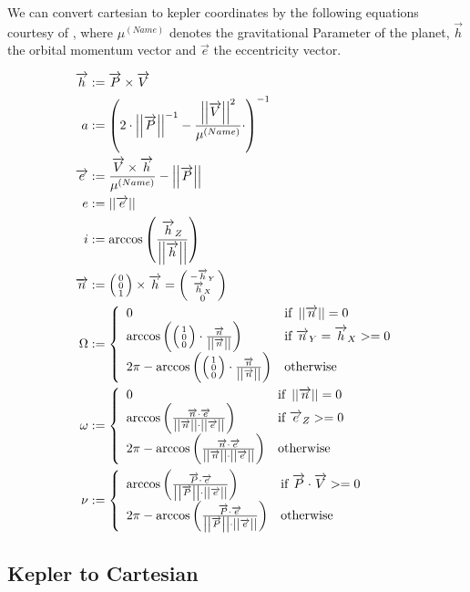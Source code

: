 \documentclass[11pt]{article}
\newcommand{\oa}[1]{\overrightarrow{#1}}
\newcommand{\Pos}{\oa{P}}
\newcommand{\Vel}{\oa{V}}
\newcommand{\absvec}[1]{\left|\left|{#1}\right|\right|}
\newcommand{\dddvec}[3]{\left(\begin{smallmatrix}{#1}\\{#2}\\{#3}\end{smallmatrix}\right)}
\begin{document}
We can convert cartesian to kepler coordinates by the following
equations courtesy of \cite{RSCK}, where $\mu^{(Name)}$ denotes the
gravitational Parameter of the planet, $\oa{h}$ the orbital momentum
vector and $\oa{e}$ the eccentricity vector.

\begin{align}
  \oa{h} &:= \Pos \times \Vel\nonumber\\
  a &:= \left(2\cdot\absvec{\Pos}^{-1} - \frac{\absvec{\Vel}^2}{\mu^{(Name)}}\cdot \right)^{-1}\\
  \oa{e} &:= \frac{\Vel\times \oa{h}}{\mu^{(Name)}} - \absvec{\Pos}\nonumber\\
  e &:= \absvec{\oa{e}}\\
  i &:= \arccos\left(\frac{\oa{h}_Z}{\absvec{\oa{h}}} \right)\\
  \oa{n} & := \dddvec{0}{0}{1} \times \oa{h} = \dddvec{-\oa{h}_Y}{\oa{h}_X}{0}\nonumber\\
  \Omega &:= \left\{
    \begin{array}{l l}
      0 & \textrm{if } \absvec{\oa{n}} = 0\\
      \arccos\left(\dddvec{1}{0}{0}\cdot\frac{\oa{n}}{\absvec{\oa{n}}} \right) & \textrm{if } \oa{n}_Y = \oa{h}_X >= 0\\
      2\pi - \arccos\left(\dddvec{1}{0}{0}\cdot\frac{\oa{n}}{\absvec{\oa{n}}} \right) & \textrm{otherwise}
    \end{array}
    \right.\\
  \omega & := \left\{
    \begin{array}{l l}
      0 & \textrm{if } \absvec{\oa{n}} = 0\\
      \arccos\left(\frac{\oa{n}\cdot\oa{e}}{\absvec{\oa{n}}\cdot\absvec{\oa{e}}} \right) & \textrm{if } \oa{e}_Z >= 0\\
      2\pi - \arccos\left(\frac{\oa{n}\cdot\oa{e}}{\absvec{\oa{n}}\cdot\absvec{\oa{e}}}\right) & \textrm{otherwise}
    \end{array}
    \right.\\
    \nu &:= \left\{
    \begin{array}{l l}
      \arccos\left(\frac{\Pos\cdot\oa{e}}{\absvec{\Pos}\cdot\absvec{\oa{e}}}\right) & \textrm{if } \Pos\cdot\Vel >= 0\\
      2\pi - \arccos\left(\frac{\Pos\cdot\oa{e}}{\absvec{\Pos}\cdot\absvec{\oa{e}}}\right) & \textrm{otherwise}
    \end{array}
    \right.
\end{align}

\subsection{Kepler to Cartesian}
\end{document}
